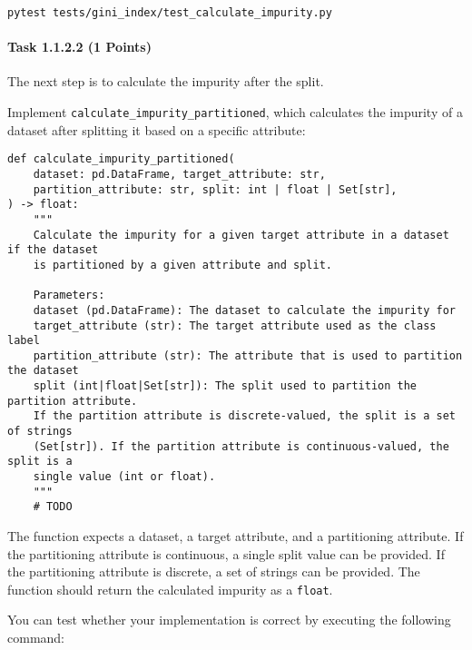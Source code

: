 \documentclass[
english,
smallborders
]{i6prcsht}
\newcommand{\points}[1]{\hfill \color{red}(#1 Points)\color{black}}
\begin{document}
\begin{lstlisting}
pytest tests/gini_index/test_calculate_impurity.py
\end{lstlisting}

\vspace*{0.1cm}

\paragraph*{Task 1.1.2.2 \points{1}} \hfill

The next step is to calculate the impurity after the split.

Implement \texttt{calculate\_impurity\_partitioned}, which calculates the impurity of a dataset after splitting it based on a specific attribute:

\vspace*{0.3cm}

\newpage

\begin{lstlisting}
def calculate_impurity_partitioned(
	dataset: pd.DataFrame, target_attribute: str,
	partition_attribute: str, split: int | float | Set[str],
) -> float:
	"""
	Calculate the impurity for a given target attribute in a dataset if the dataset
	is partitioned by a given attribute and split.

	Parameters:
	dataset (pd.DataFrame): The dataset to calculate the impurity for
	target_attribute (str): The target attribute used as the class label
	partition_attribute (str): The attribute that is used to partition the dataset
	split (int|float|Set[str]): The split used to partition the partition attribute.
	If the partition attribute is discrete-valued, the split is a set of strings
	(Set[str]). If the partition attribute is continuous-valued, the split is a
	single value (int or float).
	"""
	# TODO
\end{lstlisting}

\vspace*{0.1cm}

The function expects a dataset, a target attribute, and a partitioning attribute. If the partitioning attribute is continuous, a single split value can be provided. If the partitioning attribute is discrete, a set of strings can be provided. The function should return the calculated impurity as a \texttt{float}.

You can test whether your implementation is correct by executing the following command:

\vspace*{0.3cm}
\end{document}
